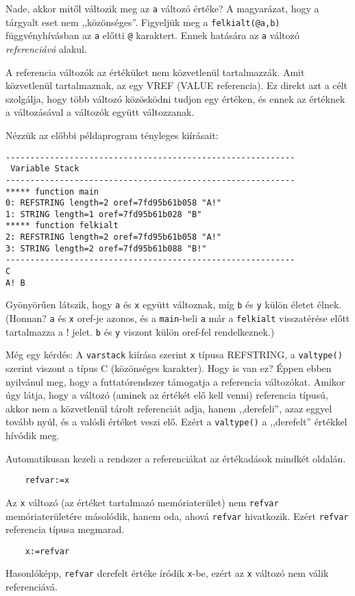Nade, akkor mitől változik meg az \verb!a! változó értéke?
A magyarázat, hogy a tárgyalt eset nem ,,közönséges''. 
Figyeljük meg a \verb!felkialt(@a,b)! függvényhívásban az \verb!a! előtti
\verb!@! karaktert. Ennek hatására az \verb!a! változó {\em referenciává\/} alakul.

A referencia változók az értéküket nem közvetlenül tartalmazzák.
Amit közvetlenül tartalmaznak, az egy VREF (VALUE referencia).
Ez direkt azt a célt szolgálja, hogy több változó közösködni
tudjon egy értéken, és ennek az értéknek a változásával
a változók együtt változzanak.

Nézzük az előbbi példaprogram tényleges kiírásait:
\begin{verbatim}
-----------------------------------------------------------
 Variable Stack
-----------------------------------------------------------
***** function main
0: REFSTRING length=2 oref=7fd95b61b058 "A!"
1: STRING length=1 oref=7fd95b61b028 "B"
***** function felkialt
2: REFSTRING length=2 oref=7fd95b61b058 "A!"
3: STRING length=2 oref=7fd95b61b088 "B!"
-----------------------------------------------------------
C
A! B
\end{verbatim}
Gyönyörűen látszik, hogy \verb!a! és \verb!x! együtt változnak,
míg \verb!b! és \verb!y! külön életet élnek.
(Honnan? \verb!a! és \verb!x! oref-je azonos, és a \verb!main!-beli
\verb!a! már a \verb!felkialt! visszatérése előtt tartalmazza a ! jelet.
\verb!b! és \verb!y! viszont külön oref-fel rendelkeznek.)

Még egy kérdés: A \verb!varstack! kiírása szerint \verb!x! típusa 
REFSTRING, a \verb!valtype()! szerint viszont a típus C (közönséges karakter). 
Hogy is van ez? Éppen ebben nyilvánul meg, hogy a futtatórendszer 
támogatja a referencia változókat. Amikor úgy látja, hogy a változó
(aminek az értékét elő kell venni) referencia típusú, akkor nem a
közvetlenül tárolt referenciát adja, hanem ,,derefeli'', azaz eggyel tovább 
nyúl, és a valódi értéket veszi elő. Ezért a \verb!valtype()!  a ,,derefelt''
értékkel hívódik meg. 

Automatikusan kezeli a rendszer
a referenciákat az értékadások mindkét oldalán.
\begin{verbatim}
    refvar:=x
\end{verbatim}
Az \verb!x! változó (az értéket tartalmazó memóriaterület) nem
\verb!refvar! memóriaterületére másolódik, hanem oda, ahová \verb!refvar!
hivatkozik. Ezért \verb!refvar! referencia típusa megmarad.

\begin{verbatim}
    x:=refvar
\end{verbatim}
Hasonlóképp, \verb!refvar! derefelt értéke íródik \verb!x!-be,
ezért az \verb!x! változó nem válik referenciává.


